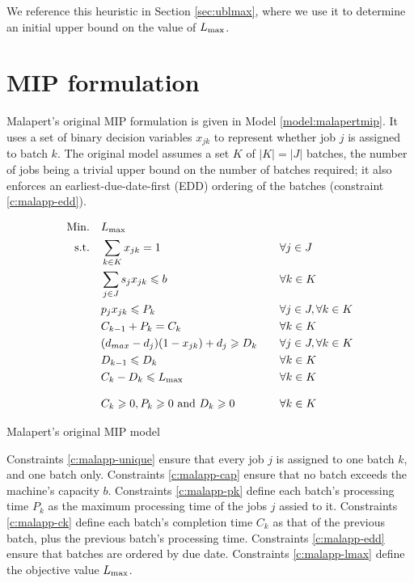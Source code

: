 \documentclass[13pt, letterpaper, oneside]{book}
\begin{document}
We reference this heuristic in Section \ref{sec:ublmax}, where we use it to
determine an initial upper bound on the value of $L_{\text{max}}$.

\section{MIP formulation}
\label{sec:malapertmip}
Malapert's original MIP formulation is given in Model \ref{model:malapertmip}. It
uses a set of binary decision variables $x_{jk}$ to represent whether job $j$ is
assigned to batch $k$. The original model assumes a set $K$ of $|K| = |J|$
batches, the number of jobs being a trivial upper bound on the number of batches
required; it also enforces an earliest-due-date-first (EDD) ordering of the
batches (constraint \eqref{c:malapp-edd}).

\begin{model}[h]
\begin{alignat}{2}
\mathrm{Min.}\quad & L_{\text{max}} && \\
\mathrm{s.t.}\quad &\sum_{k \in K} x_{jk} = 1 \quad && \forall j \in J
\label{c:malapp-unique}\\
  &\sum_{j \in J} s_j x_{jk} \leqslant b \quad && \forall k \in K\label{c:malapp-cap}\\
  &p_j x_{jk} \leqslant P_k \quad && \forall j \in J, \forall k \in
  K\label{c:malapp-pk}\\
  &C_{k-1} + P_{k} = C_k \quad && \forall k \in K\label{c:malapp-ck}\\
  &(d_{max} - d_j)(1 - x_{jk}) + d_j \geqslant D_k \quad && \forall j \in J, \forall
  k \in K\label{c:malapp-dk}\\
  &D_{k-1} \leqslant D_k \quad && \forall k \in K \label{c:malapp-edd} \\
  &C_k - D_k \leqslant L_{\text{max}} \quad && \forall k \in K\label{c:malapp-lmax}\\[2ex]
  &C_k \geqslant 0, P_k \geqslant 0 \text{ and } D_k \geqslant 0 \quad && \forall k \in K  
\end{alignat}
\caption{Malapert's original MIP model}
\label{model:malapertmip}
\end{model}

Constraints \eqref{c:malapp-unique} ensure that every job $j$ is assigned to
one batch $k$, and one batch only. Constraints \eqref{c:malapp-cap} ensure that
no batch exceeds the machine's capacity $b$. Constraints \eqref{c:malapp-pk}
define each batch's processing time $P_k$ as the maximum processing time of the
jobs $j$ assied to it. Constraints \eqref{c:malapp-ck} define each batch's
completion time $C_k$ as that of the previous batch, plus the previous batch's
processing time. Constraints \eqref{c:malapp-edd} ensure that batches are
ordered by due date. Constraints \eqref{c:malapp-lmax} define the objective
value $L_{\text{max}}$.
\end{document}
